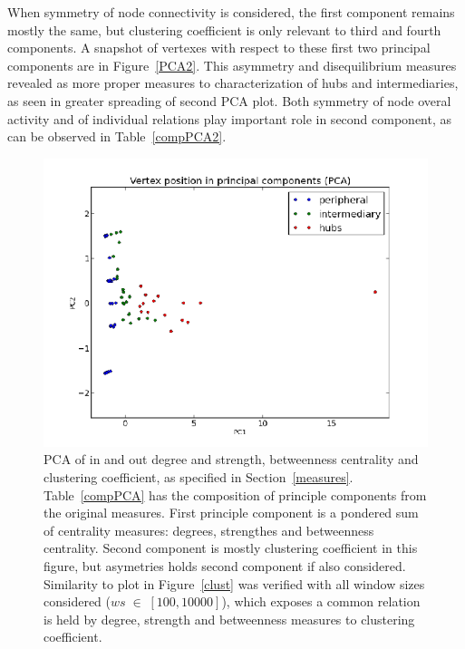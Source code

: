 \documentclass[%
 aip,
 jmp,%
 amsmath,amssymb,
 reprint,%
]{revtex4-1}
\begin{document}
When symmetry of node connectivity is considered, the first component remains mostly the same, but clustering coefficient is only relevant to third and fourth components. A snapshot of vertexes with respect to these first two principal components are in Figure~\ref{PCA2}. This asymmetry and disequilibrium measures revealed as more proper measures to characterization of hubs and intermediaries, as seen in greater spreading of second PCA plot. Both symmetry of node overal activity and of individual relations play important role in second component, as can be observed in Table~\ref{compPCA2}.


\begin{figure} 
   \centering
        \includegraphics[width=\columnwidth]{figs/ev0pr3PCA}
    \caption{PCA of in and out degree and strength, betweenness centrality and clustering coefficient, as specified in Section~\ref{measures}. Table~\ref{compPCA} has the composition of principle components from the original measures. First principle component is a pondered sum of centrality measures: degrees, strengthes and betweenness centrality. Second component is mostly clustering coefficient in this figure, but asymetries holds second component if also considered. Similarity to plot in Figure~\ref{clust} was verified with all window sizes considered ($ws\;\in\;[100,10000]$), which exposes a common relation is held by degree, strength and betweenness measures to clustering coefficient.}
    \label{PCA}
\end{figure}
\end{document}
